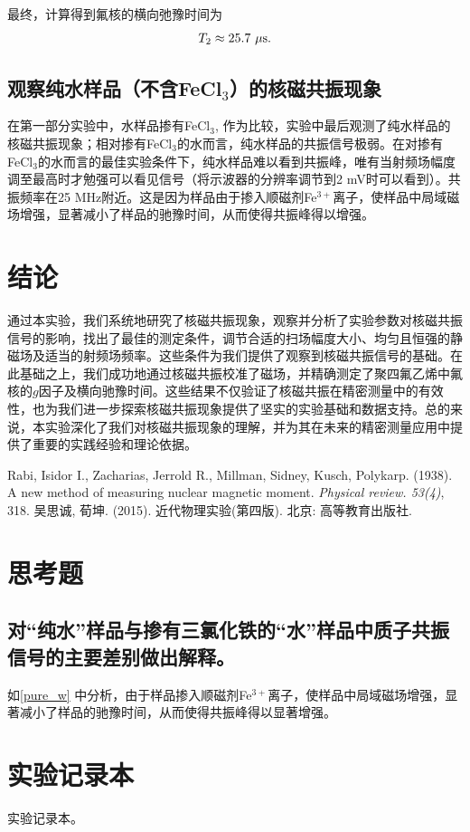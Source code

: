 \documentclass[font=default]{mpltx}
\begin{document}
最终，计算得到氟核的横向弛豫时间为
\begin{equation}
  T_2\approx25.7\ {\rm \mu s}.
\end{equation}

\subsection{观察纯水样品（不含FeCl$_3$）的核磁共振现象}\label{pure_w}
在第一部分实验中，水样品掺有FeCl$_3$, 作为比较，实验中最后观测了纯水样品的核磁共振现象；相对掺有FeCl$_3$的水而言，纯水样品的共振信号极弱。在对掺有FeCl$_3$的水而言的最佳实验条件下，纯水样品难以看到共振峰，唯有当射频场幅度调至最高时才勉强可以看见信号（将示波器的分辨率调节到2 mV时可以看到）。共振频率在25 MHz附近。这是因为样品由于掺入顺磁剂Fe$^{3+}$离子，使样品中局域磁场增强，显著减小了样品的驰豫时间，从而使得共振峰得以增强。
\section{结论}
通过本实验，我们系统地研究了核磁共振现象，观察并分析了实验参数对核磁共振信号的影响，找出了最佳的测定条件，调节合适的扫场幅度大小、均匀且恒强的静磁场及适当的射频场频率。这些条件为我们提供了观察到核磁共振信号的基础。在此基础之上，我们成功地通过核磁共振校准了磁场，并精确测定了聚四氟乙烯中氟核的$g$因子及横向驰豫时间。这些结果不仅验证了核磁共振在精密测量中的有效性，也为我们进一步探索核磁共振现象提供了坚实的实验基础和数据支持。总的来说，本实验深化了我们对核磁共振现象的理解，并为其在未来的精密测量应用中提供了重要的实践经验和理论依据。

\begin{thebibliography}{}
   Rabi, Isidor I., Zacharias, Jerrold R., Millman, Sidney, Kusch, Polykarp. (1938). A new method of measuring nuclear magnetic moment. \textit{Physical review. 53(4)}, 318.
   吴思诚, 荀坤. (2015). 近代物理实验(第四版). 北京: 高等教育出版社.
\end{thebibliography}
  
\clearpage %
\appendix %
\section{思考题}
\subsection{对“纯水”样品与掺有三氯化铁的“水”样品中质子共振信号的主要差别做出解释。}
如\autoref{pure_w} 中分析，由于样品掺入顺磁剂Fe$^{3+}$离子，使样品中局域磁场增强，显著减小了样品的驰豫时间，从而使得共振峰得以显著增强。

\section{实验记录本}
实验记录本。
\end{document}

